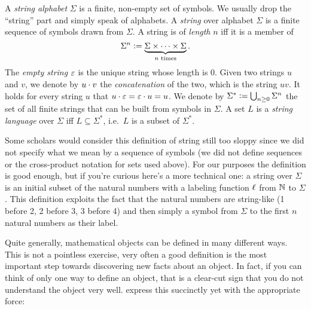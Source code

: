 \begin{definition}
    A \emph{string alphabet} $\Sigma$ is a finite, non-empty set of symbols.
    We usually drop the ``string'' part and simply speak of alphabets.
    A \emph{string} over alphabet $\Sigma$ is a finite sequence of symbols drawn from $\Sigma$.
    A string is of \emph{length} $n$ iff it is a member of
    \[
        \Sigma^n \mathrel{\mathop:}= \underbrace{\Sigma \times \cdots \times \Sigma}_{n \text{ times}}.
    \]
    The \emph{empty string} $\varepsilon$ is the unique string whose length is $0$.
    Given two strings $u$ and $v$, we denote by $u \cdot v$ the \emph{concatenation} of the two, which is the string $uv$.
    It holds for every string $u$ that $u \cdot \varepsilon = \varepsilon \cdot u = u$.
    We denote by $\Sigma^* \mathrel{\mathop:}= \bigcup_{n \geq 0} \Sigma^n$ the set of all finite strings that can be built from symbols in $\Sigma$.
    A set $L$ is a \emph{string language} over $\Sigma$ iff $L \subseteq \Sigma^*$, i.e.\ $L$ is a subset of $\Sigma^*$.
\end{definition}
%
Some scholars would consider this definition of string still too sloppy since we did not specify what we mean by a sequence of symbols (we did not define sequences or the cross-product notation for sets used above).
For our purposes the definition is good enough, but if you're curious here's a more technical one: a string over $\Sigma$ is an initial subset of the natural numbers with a labeling function $\ell$ from $\mathbb{N}$ to $\Sigma$.
This definition exploits the fact that the natural numbers are string-like (1 before 2, 2 before 3, 3 before 4) and then simply a symbol from $\Sigma$ to the first $n$ natural numbers as their label.

Quite generally, mathematical objects can be defined in many different ways.
This is not a pointless exercise, very often a good definition is the most important step towards discovering new facts about an object.
In fact, if you can think of only one way to define an object, that is a clear-cut sign that you do not understand the object very well.
\citet[10]{KeenanMoss12} express this succinctly yet with the appropriate force:
%
\begin{center}
\end{center}

